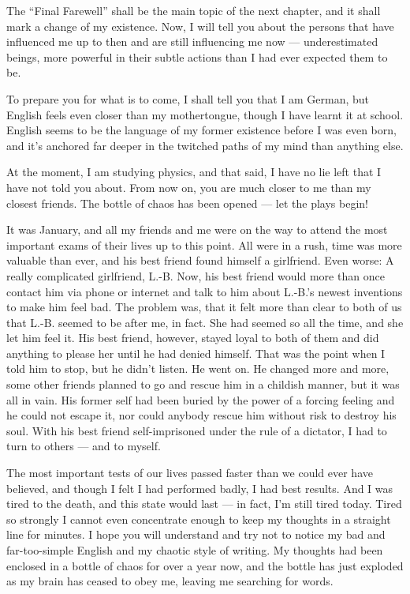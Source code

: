 The \enquote{Final Farewell} shall be the main topic of the next chapter, and it shall mark a change of my existence. Now, I will tell you about the persons that have influenced me up to then and are still influencing me now --- underestimated beings, more powerful in their subtle actions than I had ever expected them to be.

To prepare you for what is to come, I shall tell you that I am German, but English feels even closer than my mothertongue, though I have learnt it at school. English seems to be the language of my former existence before I was even born, and it's anchored far deeper in the twitched paths of my mind than anything else.

At the moment, I am studying physics, and that said, I have no lie left that I have not told you about. From now on, you are much closer to me than my closest friends. 
The bottle of chaos has been opened --- let the plays begin!

It was January, and all my friends and me were on the way to attend the most important exams of their lives up to this point. All were in a rush, time was more valuable than ever, and his best friend found himself a girlfriend. Even worse: A really complicated girlfriend, L.-B. Now, his best friend would more than once contact him via phone or internet and talk to him about L.-B.'s newest inventions to make him feel bad. The problem was, that it felt more than clear to both of us that L.-B. seemed to be after me, in fact. She had seemed so all the time, and she let him feel it. His best friend, however, stayed loyal to both of them and did anything to please her until he had denied himself. That was the point when I told him to stop, but he didn't listen. He went on. He changed more and more, some other friends planned to go and rescue him in a childish manner, but it was all in vain. His former self had been buried by the power of a forcing feeling and he could not escape it, nor could anybody rescue him without risk to destroy his soul. With his best friend self-imprisoned under the rule of a dictator, I had to turn to others --- and to myself.

The most important tests of our lives passed faster than we could ever have believed, and though I felt I had performed badly, I had best results. And I was tired to the death, and this state would last --- in fact, I'm still tired today. Tired so strongly I cannot even concentrate enough to keep my thoughts in a straight line for minutes. I hope you will understand and try not to notice my bad and far-too-simple English and my chaotic style of writing. My thoughts had been enclosed in a bottle of chaos for over a year now, and the bottle has just exploded as my brain has ceased to obey me, leaving me searching for words.


